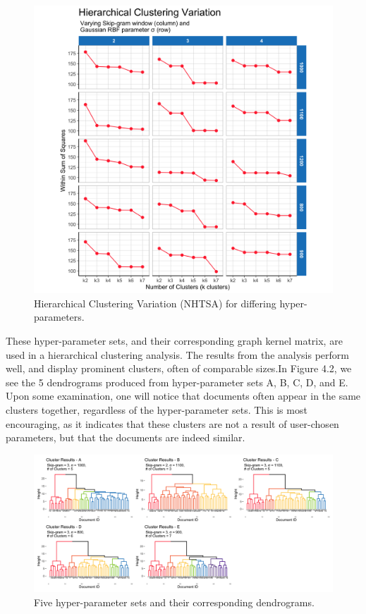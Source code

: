 \begin{figure}
\includegraphics[width=6in]{Content/Images/hclust_variation.png}
\caption{Hierarchical Clustering Variation (NHTSA) for differing hyper-parameters.}
\end{figure}

These hyper-parameter sets, and their corresponding graph kernel matrix, are used in a hierarchical clustering analysis. The results from the analysis perform well, and display prominent clusters, often of comparable sizes.In Figure 4.2, we see the 5 dendrograms produced from hyper-parameter sets A, B, C, D, and E. Upon some examination, one will notice that documents often appear in the same clusters together, regardless of the hyper-parameter sets. This is most encouraging, as it indicates that these clusters are not a result of user-chosen parameters, but that the documents are indeed similar. \\

\begin{figure}
\includegraphics[width=6in]{Content/Images/5cluster.png}
\caption{Five hyper-parameter sets and their corresponding dendrograms.}
\end{figure}

